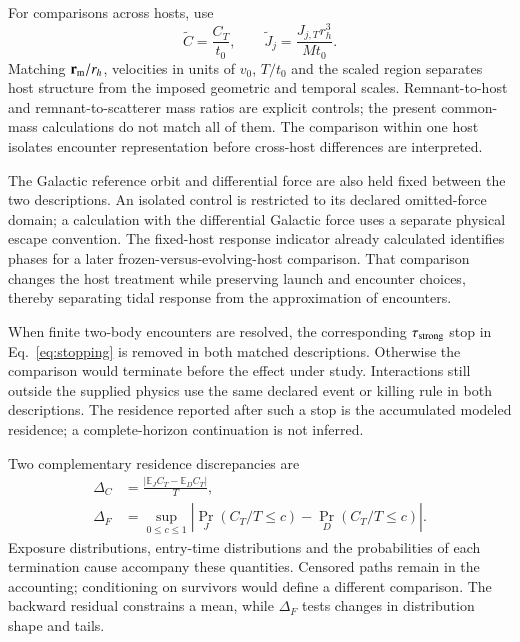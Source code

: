 \documentclass[aps,prd,reprint,amsmath,amssymb,superscriptaddress,nofootinbib,longbibliography,floatfix]{revtex4-2}
\begin{document}
For comparisons across hosts, use
\begin{equation}
\widetilde C=\frac{C_T}{t_0},\qquad
\widetilde J_j=\frac{J_{j,T}r_h^3}{M t_0}.
\label{eq:dimensionless-observables}
\end{equation}
Matching $\mathbf r_{\rm m}/r_h$, velocities in units of $v_0$, $T/t_0$ and the scaled region separates host structure from the imposed geometric and temporal scales. Remnant-to-host and remnant-to-scatterer mass ratios are explicit controls; the present common-mass calculations do not match all of them. The comparison within one host isolates encounter representation before cross-host differences are interpreted.

The Galactic reference orbit and differential force are also held fixed between the two descriptions. An isolated control is restricted to its declared omitted-force domain; a calculation with the differential Galactic force uses a separate physical escape convention. The fixed-host response indicator already calculated identifies phases for a later frozen-versus-evolving-host comparison. That comparison changes the host treatment while preserving launch and encounter choices, thereby separating tidal response from the approximation of encounters.

When finite two-body encounters are resolved, the corresponding $\tau_{\rm strong}$ stop in Eq.~\eqref{eq:stopping} is removed in both matched descriptions. Otherwise the comparison would terminate before the effect under study. Interactions still outside the supplied physics use the same declared event or killing rule in both descriptions. The residence reported after such a stop is the accumulated modeled residence; a complete-horizon continuation is not inferred.

Two complementary residence discrepancies are
\begin{align}
\Delta_C&=\frac{|\mathbb E_J C_T-\mathbb E_D C_T|}{T},\nonumber\\
\Delta_F&=\sup_{0\leq c\leq1}
\left|\Pr_J(C_T/T\leq c)-\Pr_D(C_T/T\leq c)\right|.
\label{eq:residence-comparison}
\end{align}
Exposure distributions, entry-time distributions and the probabilities of each termination cause accompany these quantities. Censored paths remain in the accounting; conditioning on survivors would define a different comparison. The backward residual constrains a mean, while $\Delta_F$ tests changes in distribution shape and tails.
\end{document}
